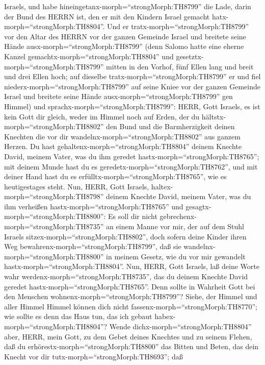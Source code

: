 Israels,  und habe
hineingetanx-morph=``strongMorph:TH8799'' die Lade, darin der Bund des
HERRN ist, den er mit den Kindern Israel gemacht
hatx-morph=``strongMorph:TH8804''.  Und er
tratx-morph=``strongMorph:TH8799'' vor den Altar des HERRN vor der
ganzen Gemeinde Israel und breitete seine Hände
ausx-morph=``strongMorph:TH8799''  (denn Salomo hatte eine
eherne Kanzel gemachtx-morph=``strongMorph:TH8804'' und
gesetztx-morph=``strongMorph:TH8799'' mitten in den Vorhof, fünf Ellen
lang und breit und drei Ellen hoch; auf dieselbe
tratx-morph=``strongMorph:TH8799'' er und fiel
niederx-morph=``strongMorph:TH8799'' auf seine Kniee vor der ganzen
Gemeinde Israel und breitete seine Hände
ausx-morph=``strongMorph:TH8799'' gen Himmel)  und
sprachx-morph=``strongMorph:TH8799'': HERR, Gott Israels, es ist kein
Gott dir gleich, weder im Himmel noch auf Erden, der du
hältstx-morph=``strongMorph:TH8802'' den Bund und die Barmherzigkeit
deinen Knechten die vor dir wandelnx-morph=``strongMorph:TH8802'' aus
ganzem Herzen.  Du hast
gehaltenx-morph=``strongMorph:TH8804'' deinem Knechte David, meinem
Vater, was du ihm geredet hastx-morph=``strongMorph:TH8765''; mit deinem
Munde hast du es geredetx-morph=``strongMorph:TH8762'', und mit deiner
Hand hast du es erfülltx-morph=``strongMorph:TH8765'', wie es
heutigestages steht.  Nun, HERR, Gott Israels,
haltex-morph=``strongMorph:TH8798'' deinem Knechte David, meinem Vater,
was du ihm verheißen hastx-morph=``strongMorph:TH8765'' und
gesagtx-morph=``strongMorph:TH8800'': Es soll dir nicht
gebrechenx-morph=``strongMorph:TH8735'' an einem Manne vor mir, der auf
dem Stuhl Israels sitzex-morph=``strongMorph:TH8802'', doch sofern deine
Kinder ihren Weg bewahrenx-morph=``strongMorph:TH8799'', daß sie
wandelnx-morph=``strongMorph:TH8800'' in meinem Gesetz, wie du vor mir
gewandelt hastx-morph=``strongMorph:TH8804''.  Nun, HERR,
Gott Israels, laß deine Worte wahr werdenx-morph=``strongMorph:TH8735'',
das du deinem Knechte David geredet hastx-morph=``strongMorph:TH8765''.
 Denn sollte in Wahrheit Gott bei den Menschen
wohnenx-morph=``strongMorph:TH8799''? Siehe, der Himmel und aller Himmel
Himmel können dich nicht fassenx-morph=``strongMorph:TH8770''; wie
sollte es denn das Haus tun, das ich gebaut
habex-morph=``strongMorph:TH8804''?  Wende
dichx-morph=``strongMorph:TH8804'' aber, HERR, mein Gott, zu dem Gebet
deines Knechtes und zu seinem Flehen, daß du
erhörestx-morph=``strongMorph:TH8800'' das Bitten und Beten, das dein
Knecht vor dir tutx-morph=``strongMorph:TH8693'';  daß
